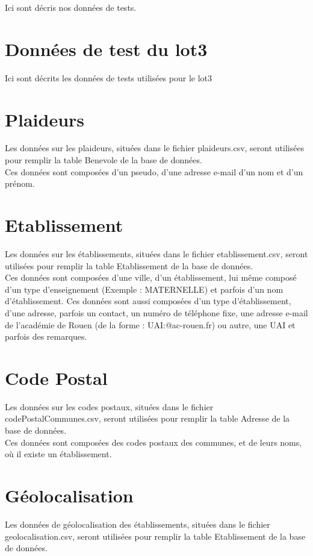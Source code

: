 

Ici sont décris nos données de tests.

\section{Données de test du lot3}
	Ici sont décrits les données de tests utilisées pour le lot3

\section{Plaideurs}
	Les données sur les plaideurs, situées dans le fichier plaideurs.csv, seront utilisées pour remplir la table Benevole de la base de données. \\
	
	Ces données sont composées d'un pseudo, d'une adresse e-mail d'un nom et d'un prénom.	
\section{Etablissement}
	Les données sur les établissements, situées dans le fichier etablissement.csv, seront utilisées pour remplir la table Etablissement de la base de données. \\
	
	Ces données sont composées d'une ville, d'un établissement, lui même composé d'un type d'enseignement (Exemple : MATERNELLE) et parfois d'un nom d'établissement. Ces données sont aussi composées d'un type d'établissement, d'une adresse, parfois un contact, un numéro de téléphone fixe, une adresse e-mail de l'académie de Rouen (de la forme : UAI:@ac-rouen.fr) ou autre, une UAI et parfois des remarques.
	
\section{Code Postal}
	Les données sur les codes postaux, situées dans le fichier codePostalCommunes.csv, seront utilisées pour remplir la table Adresse de la base de données. \\
	
	Ces données sont composées des codes postaux des communes, et de leurs noms, où il existe un établissement.
	
\section{Géolocalisation}
	Les données de géolocalisation des établissements, situées dans le fichier geolocalisation.csv, seront utilisées pour remplir la table Etablissement de la base de données. \\
	
